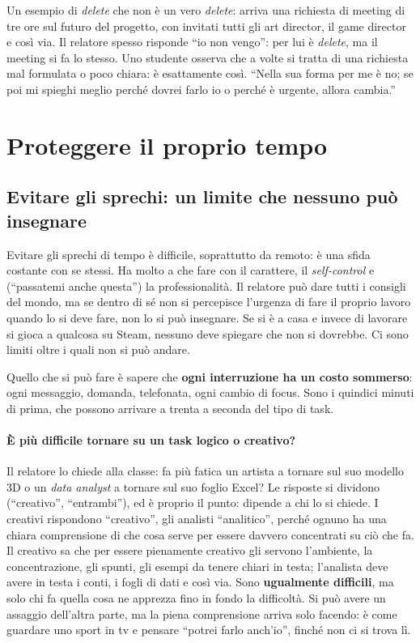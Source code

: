 Un esempio di \emph{delete} che non è un vero \emph{delete}: arriva una richiesta
di meeting di tre ore sul futuro del progetto, con invitati tutti gli art
director, il game director e così via. Il relatore spesso risponde ``io non
vengo'': per lui è \emph{delete}, ma il meeting si fa lo stesso. Uno studente
osserva che a volte si tratta di una richiesta mal formulata o poco chiara: è
esattamente così. ``Nella sua forma per me è no; se poi mi spieghi meglio perché
dovrei farlo io o perché è urgente, allora cambia.''

\section{Proteggere il proprio tempo}
\label{sec:z2-proteggere}

\subsection{Evitare gli sprechi: un limite che nessuno può insegnare}

Evitare gli sprechi di tempo è difficile, soprattutto da remoto: è una sfida
costante con se stessi. Ha molto a che fare con il carattere, il
\emph{self-control} e (``passatemi anche questa'') la professionalità. Il
relatore può dare tutti i consigli del mondo, ma se dentro di sé non si percepisce
l'urgenza di fare il proprio lavoro quando lo si deve fare, non lo si può
insegnare. Se si è a casa e invece di lavorare si gioca a qualcosa su Steam,
nessuno deve spiegare che non si dovrebbe. Ci sono limiti oltre i quali non si
può andare.

Quello che si può fare è sapere che \textbf{ogni interruzione ha un costo
sommerso}: ogni messaggio, domanda, telefonata, ogni cambio di focus. Sono i
quindici minuti di prima, che possono arrivare a trenta a seconda del tipo di
task.

\paragraph{È più difficile tornare su un task logico o creativo?} Il relatore lo
chiede alla classe: fa più fatica un artista a tornare sul suo modello 3D o un
\emph{data analyst} a tornare sul suo foglio Excel? Le risposte si dividono
(``creativo'', ``entrambi''), ed è proprio il punto: dipende a chi lo si chiede. I
creativi rispondono ``creativo'', gli analisti ``analitico'', perché ognuno ha una
chiara comprensione di che cosa serve per essere davvero concentrati su ciò che
fa. Il creativo sa che per essere pienamente creativo gli servono l'ambiente, la
concentrazione, gli spunti, gli esempi da tenere chiari in testa; l'analista deve
avere in testa i conti, i fogli di dati e così via. Sono \textbf{ugualmente
difficili}, ma solo chi fa quella cosa ne apprezza fino in fondo la difficoltà. Si
può avere un assaggio dell'altra parte, ma la piena comprensione arriva solo
facendo: è come guardare uno sport in tv e pensare ``potrei farlo anch'io'',
finché non ci si trova lì.

